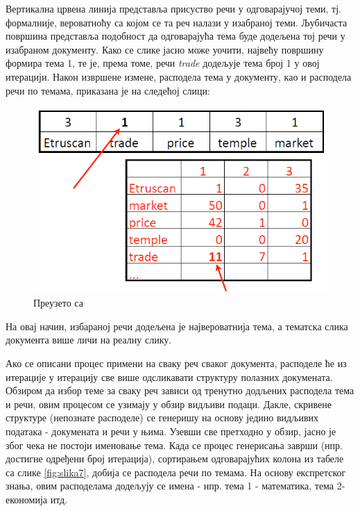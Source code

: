 Вертикална црвена линија представља присуство речи у одговарајучој теми, тј. формалније, вероватноћу са којом се та реч налази у изабраној теми. Љубичаста површина представља подобност да одговарајућа тема буде додељена тој речи у изабраном документу. Како се слике јасно може уочити, највећу  површину формира тема 1, те је, према томе, речи  \textit{trade} додељује тема број 1 у овој итерацији. Након извршене измене, расподела тема у документу, као и расподела речи по темама, приказана је на следећој слици: %



\begin{figure}[H]
    \centering
   \includegraphics[scale=0.6]{./Slike/slika11.png} 
	\caption{Преузето са \cite{mimno1}}
	\label{fig:slika11}
\end{figure}


На овај начин, избараној речи додељена је највероватнија тема, а тематска слика документа више личи на реалну слику. 

Ако се описани процес примени на сваку реч сваког документа, расподеле ће из итерације у итерацију све више одсликавати структуру полазних докумената. Обзиром да избор теме за сваку реч зависи од тренутно додљених расподела тема и речи, овим процесом се узимају у обзир видљиви подаци. Дакле, скривене структуре (непознате расподеле) се генеришу на основу једино видљивих података - докумената и речи у њима. Узевши све претходно у обзир, јасно је због чека не постоји именовање тема. Када се процес генерисања  заврши (нпр. достигне  одређени број итерација), сортирањем одговарајућих колона из табеле са слике \ref{fig:slika7}, добија се  расподела речи по темама. На основу експретског знања, овим расподелама додељују се имена - нпр. тема 1 - математика, тема 2- економија итд.

